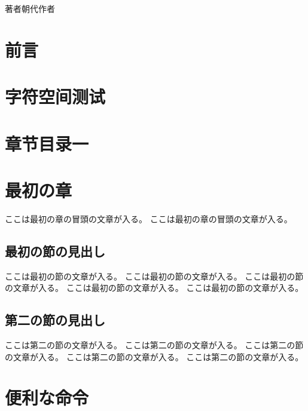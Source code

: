 \documentclass[uplatex,dvipdfmx,tate,book,twoside,openright,onecolumn,hanging_punctuation,
paper=b6,
line_length=40zh,
number_of_lines=15,
linegap=0.75zw, 
headfoot_sidemargin=12zw,
column_gap=0zh,
open_bracket_pos=nibu_tentsuki,%
]{jlreq}
\begin{document}
\begin{titlepage}
  \vspace*{10mm}
  \vfill

  \begin{flushright}
    {\mcfamily\huge 著者\quad 朝代\quad 作者}
  \end{flushright}
\end{titlepage}

\setlength{\parindent}{2.4zw}
\AddEverypageHook{%
  \BgMaterial
}
\chapter*{前言}
\fontsize{12pt}{17.1}\selectfont
\zhlipsum[1-5][name=trad]
\fontsize{12pt}{15}\selectfont
\tableofcontents %
\clearpage
\pagestyle{plain}
\setlength{\parindent}{2.4zw}
\Large
\chapter{字符空间测试}


\pagestyle{plain}
\chapter{章节目录一}
\zhlipsum[1-5][name=trad]
\chapter{最初の章}
ここは最初の章の冒頭の文章が入る。
ここは最初の章の冒頭の文章が入る。
\section{最初の節の見出し}
ここは最初の節の文章が入る。
ここは最初の節の文章が入る。
ここは最初の節の文章が入る。
ここは最初の節の文章が入る。
ここは最初の節の文章が入る。
\section{第二の節の見出し}
ここは第二の節の文章が入る。
ここは第二の節の文章が入る。
ここは第二の節の文章が入る。
ここは第二の節の文章が入る。
ここは第二の節の文章が入る。

\chapter{便利な命令}
\end{document}
